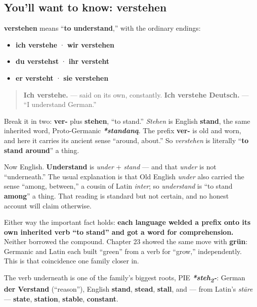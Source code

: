 \subsection*{You'll want to know: verstehen}
\textbf{verstehen} means \textquotedblleft{}\textbf{to understand},\textquotedblright{} with the ordinary endings:

\begin{itemize}
\raggedright
  \item \textbf{ich verstehe} · \textbf{wir verstehen}
  \item \textbf{du verstehst} · \textbf{ihr versteht}
  \item \textbf{er versteht} · \textbf{sie verstehen}
\end{itemize}

\begin{quote}
\textbf{Ich verstehe.} — said on its own, constantly. \textbf{Ich verstehe Deutsch.} — \textquotedblleft{}I understand German.\textquotedblright{}
\end{quote}

\begin{cousinweb}
Break it in two: \textbf{ver-} plus \textbf{stehen}, \textquotedblleft{}to stand.\textquotedblright{} \emph{Stehen} is English \textbf{stand}, the same inherited word, Proto-Germanic \emph{\textbf{*standaną}}. The prefix \textbf{ver-} is old and worn, and here it carries its ancient sense \textquotedblleft{}around, about.\textquotedblright{} So \emph{verstehen} is literally \textquotedblleft{}\textbf{to stand around}\textquotedblright{} a thing.

Now English. \textbf{Understand} is \emph{under} + \emph{stand} — and that \emph{under} is not \textquotedblleft{}underneath.\textquotedblright{} The usual explanation is that Old English \emph{under} also carried the sense \textquotedblleft{}among, between,\textquotedblright{} a cousin of Latin \emph{inter}; so \emph{understand} is \textquotedblleft{}to stand \textbf{among}\textquotedblright{} a thing. That reading is standard but not certain, and no honest account will claim otherwise.

Either way the important fact holds: \textbf{each language welded a prefix onto its own inherited verb \textquotedblleft{}to stand\textquotedblright{} and got a word for comprehension.} Neither borrowed the compound. Chapter 23 showed the same move with \textbf{grün}: Germanic and Latin each built \textquotedblleft{}green\textquotedblright{} from a verb for \textquotedblleft{}grow,\textquotedblright{} independently. This is that coincidence one family closer in.

The verb underneath is one of the family's biggest roots, PIE \emph{\textbf{*steh\textsubscript{2}-}}: German \textbf{der Verstand} (\textquotedblleft{}reason\textquotedblright{}), English \textbf{stand}, \textbf{stead}, \textbf{stall}, and — from Latin's \emph{stāre} — \textbf{state}, \textbf{station}, \textbf{stable}, \textbf{constant}.
\end{cousinweb}

